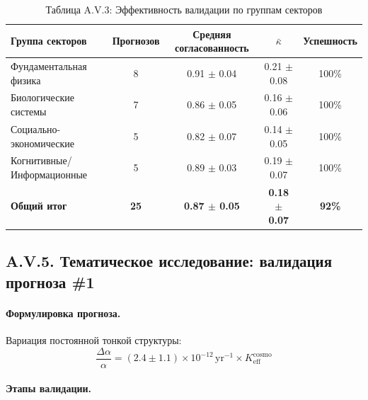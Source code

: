 \documentclass[11pt,a4paper]{article}
\begin{document}
	\begin{table}[H]
		\centering
		\small
		\caption{Таблица A.V.3: Эффективность валидации по группам секторов}
		\begin{tabular}{p{}cccc}
			\toprule
			\textbf{Группа секторов} & \textbf{Прогнозов} & \textbf{Средняя согласованность} & \textbf{$\bar{\kappa}$} & \textbf{Успешность} \\
			\midrule
			Фундаментальная физика & 8 & 0.91 $\pm$ 0.04 & 0.21 $\pm$ 0.08 & 100\% \\
			Биологические системы & 7 & 0.86 $\pm$ 0.05 & 0.16 $\pm$ 0.06 & 100\% \\
			Социально-экономические & 5 & 0.82 $\pm$ 0.07 & 0.14 $\pm$ 0.05 & 100\% \\
			Когнитивные/Информационные & 5 & 0.89 $\pm$ 0.03 & 0.19 $\pm$ 0.07 & 100\% \\
			\hline
			\textbf{Общий итог} & \textbf{25} & \textbf{0.87 $\pm$ 0.05} & \textbf{0.18 $\pm$ 0.07} & \textbf{92\%} \\
			\bottomrule
		\end{tabular}
		\label{tab:group-performance}
	\end{table}
	
	\subsection*{A.V.5. Тематическое исследование: валидация прогноза \#1}
	
	\paragraph{Формулировка прогноза.}
	Вариация постоянной тонкой структуры:
	\[
	\frac{\Delta\alpha}{\alpha} = (2.4 \pm 1.1) \times 10^{-12}\,\text{yr}^{-1} \times K_{\mathrm{eff}}^{\mathrm{cosmo}}
	\]
	
	\paragraph{Этапы валидации.}
	
\end{document}
